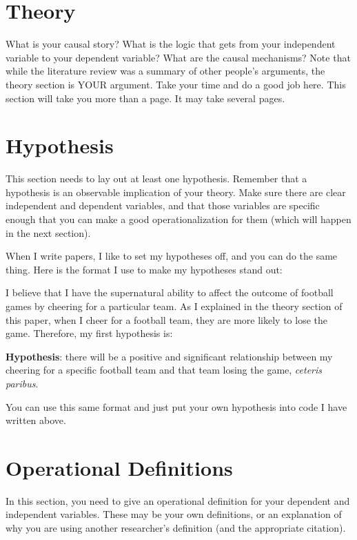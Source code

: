 \documentclass{article}
\begin{document}
\section{Theory}
What is your causal story? What is the logic that gets from your independent variable to your dependent variable? What are the causal mechanisms? Note that while the literature review was a summary of other people's arguments, the theory section is YOUR argument. Take your time and do a good job here. This section will take you more than a page. It may take several pages.

\section{Hypothesis}
This section needs to lay out at least one hypothesis. Remember that a hypothesis is an observable implication of your theory. Make sure there are clear independent and dependent variables, and that those variables are specific enough that you can make a good operationalization for them (which will happen in the next section).

When I write papers, I like to set my hypotheses off, and you can do the same thing. Here is the format I use to make my hypotheses stand out:

I believe that I have the supernatural ability to affect the outcome of football games by cheering for a particular team. As I explained in the theory section of this paper, when I cheer for a football team, they are more likely to lose the game. Therefore, my first hypothesis is:

\begin{description}
		\item \textbf{Hypothesis}: there will be a positive and significant relationship between my cheering for a specific football team and that team losing the game, \emph{ceteris paribus}.
	\end{description} 

You can use this same format and just put your own hypothesis into code I have written above.

\section{Operational Definitions}
In this section, you need to give an operational definition for your dependent and independent variables. These may be your own definitions, or an explanation of why you are using another researcher's definition (and the appropriate citation). 
\end{document}

